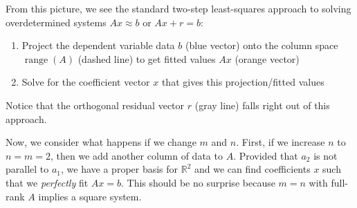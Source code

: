 \documentclass[12pt]{article}
\numberwithin{equation}{section} %
\theoremstyle{plain}
\theoremstyle{definition}
\theoremstyle{remark}
\newcommand{\R}{\mathbb{R}}
\newcommand{\range}{\operatorname{range}}
\begin{document}
\begin{figure}[htbp!]
\centering
{}
\end{figure}

From this picture, we see the standard two-step least-squares approach
to solving overdetermined systems $Ax\approx b$ or $Ax+r=b$:
\begin{enumerate}
  \item Project the dependent variable data $b$ (blue vector) onto the
    column space $\range(A)$ (dashed line) to get fitted values $Ax$
    (orange vector)
  \item Solve for the coefficient vector $x$ that gives this
    projection/fitted values
\end{enumerate}
Notice that the orthogonal residual vector $r$ (gray line) falls right
out of this approach.

\clearpage
Now, we consider what happens if we change $m$ and $n$. First, if we
increase $n$ to $n=m=2$, then we add another column of data to $A$.
Provided that $a_2$ is not parallel to $a_1$, we have a proper basis for
$\R^2$ and we can find coefficients $x$ such that we \emph{perfectly}
fit $Ax=b$. This should be no surprise because $m=n$ with full-rank $A$
implies a square system.
\end{document}
